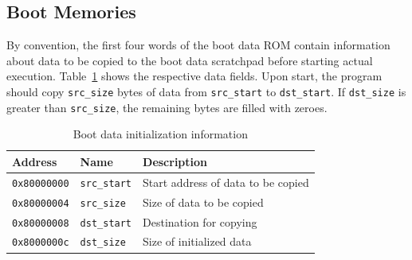 \documentclass[a4paper,fontsize=10pt,twoside,DIV15,BCOR12mm,headinclude=true,footinclude=false,pagesize,bibtotoc]{scrbook}
\newcommand{\code}[1]{{\texttt{#1}}}
\newcommand{\comment}[3]{

\textsf{\textbf{#1}} {\color{#3}#2}}
\newcommand{\stefan}[1]{\comment{Stefan}{#1}{RoyalPurple}}
\renewcommand{\stefan}[1]{}
\begin{document}
\subsection{Boot Memories}

By convention, the first four words of the boot data ROM contain
information about data to be copied to the boot data scratchpad before
starting actual execution. Table~\ref{tab:bootrommap} shows the
respective data fields. Upon start, the program should copy
\code{src\_size} bytes of data from \code{src\_start} to
\code{dst\_start}. If \code{dst\_size} is greater than
\code{src\_size}, the remaining bytes are filled with zeroes.

\begin{table}
\centering
\begin{tabular}{lll}
\toprule
Address & Name & Description \\
\midrule
\code{0x80000000} & \code{src\_start} & Start address of data to be copied \\
\code{0x80000004} & \code{src\_size} & Size of data to be copied \\
\code{0x80000008} & \code{dst\_start} & Destination for copying \\
\code{0x8000000c} & \code{dst\_size} & Size of initialized data \\
\bottomrule
\end{tabular}
\caption{Boot data initialization information}
\label{tab:bootrommap}
\end{table}


\stefan{We discussed about making the stack cache memory mapped, like the SPM. The disadvantage is that
we need to reserve an additional register for the stack pointer of the stack cache. s5 (the stack cache spill pointer) must point into a main
memory address range. s6 (the stack top pointer) must point to the top of the stack cache in the cache address range and must be modifiable
(for context switching). An additional s7 must either contain the size of the stack cache or the tail pointer of the stack cache.

The advantage is we can then pass typed pointers to functions, similar to SPM pointers, if the caller stack frame is not evicted, in a first
step. As a second step, we can drop the typed loads and use the compiler to emit address range information to the WCET analysis.
A pointer into the stack cache address range is always guaranteed to be a hit (accessing an address that has been evicted is an error). We
can therefore get rid of function duplication depending on their pointer types. We basically move the information about the accessed memory from the
memory instruction to the pointer value, which can be context-sensitive.}
\end{document}
